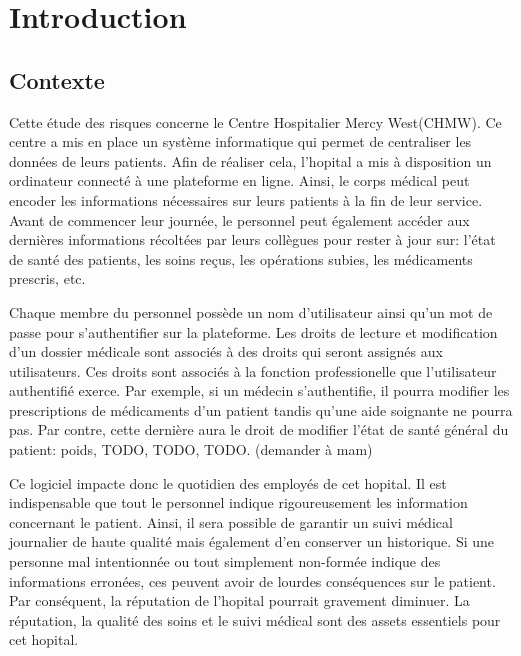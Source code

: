 \documentclass[12pt]{article}
\begin{document}
\newpage
\renewcommand{\contentsname}{Table des matières}
\tableofcontents
\newpage

\section{Introduction} 

\subsection{Contexte}

\justify
Cette étude des risques concerne le Centre Hospitalier Mercy West(CHMW). Ce centre a mis en place un système informatique qui permet de centraliser les données de leurs patients. Afin de réaliser cela, l'hopital a mis à disposition un ordinateur connecté à une plateforme en ligne. Ainsi, le corps médical peut encoder les informations nécessaires sur leurs patients à la fin de leur service. Avant de commencer leur journée, le personnel peut également accéder aux dernières informations récoltées par leurs collègues pour rester à jour sur: l'état de santé des patients, les soins reçus, les opérations subies, les médicaments prescris, etc.

\justify
Chaque membre du personnel possède un nom d'utilisateur ainsi qu'un mot de passe pour s'authentifier sur la plateforme. Les droits de lecture et modification d'un dossier médicale sont associés à des droits qui seront assignés aux utilisateurs.  Ces droits sont associés à la fonction professionelle que l'utilisateur authentifié exerce. Par exemple, si un médecin s'authentifie, il pourra modifier les prescriptions de médicaments d'un patient tandis qu'une aide soignante ne pourra pas. Par contre, cette dernière aura le droit de modifier l'état de santé général du patient: poids, TODO, TODO, TODO. (demander à mam)

\justify
Ce logiciel impacte donc le quotidien des employés de cet hopital. Il est indispensable que tout le personnel indique rigoureusement les information concernant le patient. Ainsi, il sera possible de garantir un suivi médical journalier de haute qualité mais également d'en conserver un historique. Si une personne mal intentionnée ou tout simplement non-formée indique des informations erronées, ces peuvent avoir de lourdes conséquences sur le patient. Par conséquent, la réputation de l'hopital pourrait gravement diminuer. La réputation, la qualité des soins et le suivi médical sont des assets essentiels pour cet hopital. 
\end{document}
